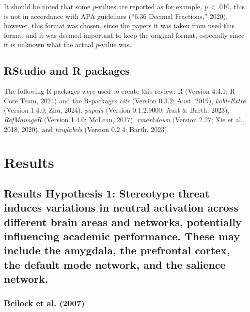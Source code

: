 \documentclass[
  stu,floatsintext]{apa7}
\begin{document}
It should be noted that some \emph{p}-values are reported as for example, \emph{p} \textless{} .010, this is not in accordance with APA guidelines ({``6.36 {Decimal Fractions},''} 2020), however, this format was chosen, since the papers it was taken from used this format and it was deemed important to keep the original format, especially since it is unknown what the actual \emph{p}-value was.

\subsection{RStudio and R packages}\label{rstudio-and-r-packages}

The following R packages were used to create this review: R (Version 4.4.1; R Core Team, 2024) and the R-packages \emph{citr} (Version 0.3.2; Aust, 2019), \emph{kableExtra} (Version 1.4.0; Zhu, 2024), \emph{papaja} (Version 0.1.2.9000; Aust \& Barth, 2023), \emph{RefManageR} (Version 1.4.0; McLean, 2017), \emph{rmarkdown} (Version 2.27; Xie et al., 2018, 2020), and \emph{tinylabels} (Version 0.2.4; Barth, 2023).

\section{Results}\label{results}

\subsection{Results Hypothesis 1: Stereotype threat induces variations in neutral activation across different brain areas and networks, potentially influencing academic performance. These may include the amygdala, the prefrontal cortex, the default mode network, and the salience network.}\label{results-hypothesis-1-stereotype-threat-induces-variations-in-neutral-activation-across-different-brain-areas-and-networks-potentially-influencing-academic-performance.-these-may-include-the-amygdala-the-prefrontal-cortex-the-default-mode-network-and-the-salience-network.}

\subsubsection{Beilock et al. (2007)}\label{beilockstereotypethreatworking2007}
\end{document}
